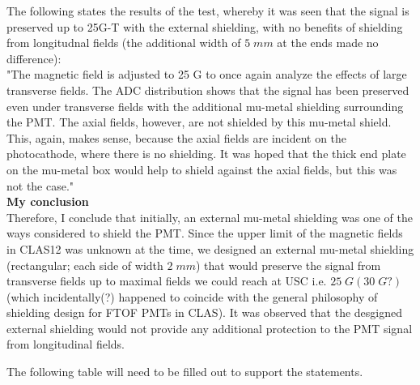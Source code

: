 \documentclass[12pt]{article}
\begin{document}
The following states the results of the test, whereby it was seen that the signal is preserved up to 25G-T with the external shielding, with no benefits of shielding from longitudnal fields (the additional width of $5\;mm$ at the ends made no difference):\\
\newline
"The magnetic field is adjusted to 25 G to once again analyze the effects of large transverse fields. The ADC distribution shows that the signal has been preserved even under transverse fields with the additional mu-metal shielding surrounding the PMT. The axial fields, however, are not shielded by this mu-metal shield. This, again, makes sense, because the axial fields are incident on the photocathode, where there is no shielding. It was hoped that the thick end plate on the mu-metal box would help to shield against the axial fields, but this was not the case."\\
\newline
\textbf{My conclusion} \\
Therefore, I conclude that initially, an external mu-metal shielding was one of the ways considered to shield the PMT. Since the upper limit of the magnetic fields in CLAS12 was unknown at the time, we designed an external mu-metal shielding (rectangular; each side of width $2\;mm$) that would preserve the signal from transverse fields up to maximal fields we could reach at USC i.e. $25\;G(30\;G?)$ (which incidentally(?) happened to coincide with the general philosophy of shielding design for FTOF PMTs in CLAS). It was observed that the desgigned external shielding would not provide any additional protection to the PMT signal from longitudinal fields. 

The following table will need to be filled out to support the statements.
\end{document}
